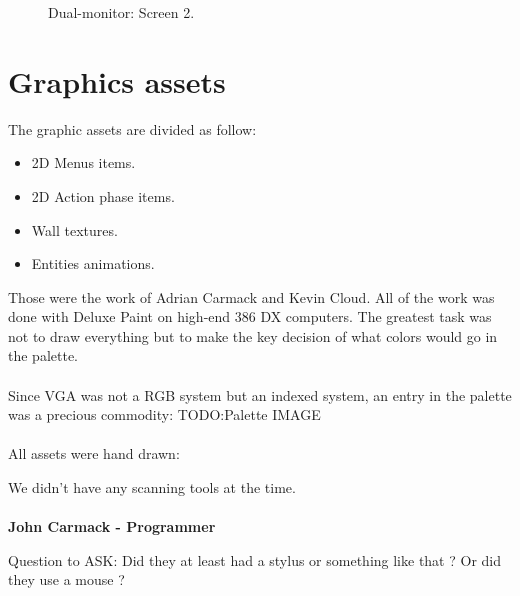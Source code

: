 \documentclass[book.tex]{subfiles}
\begin{document}
\begin{figure}[H]
\centering
\caption{Dual-monitor: Screen 2.}
\label{fig:dm1}
\end{figure}



 
 
 




\section{Graphics assets}
The graphic assets are divided as follow:
\begin{itemize}
\item 2D Menus items.
\item 2D Action phase items.
\item Wall textures.
\item Entities animations.
\end{itemize}
Those were the work of Adrian Carmack and Kevin Cloud. All of the work was done with Deluxe Paint on high-end 386 DX computers. The greatest task was not to draw everything but to make the key decision of what colors would go in the palette.\\
\\
Since VGA was not a RGB system but an indexed system, an entry in the palette was a precious commodity:
TODO:Palette IMAGE\\
\\
All assets were hand drawn:\\
\begin{fancyquotes}
We didn't have any scanning tools at the time.\\
\\
\textbf{John Carmack - Programmer}
\end{fancyquotes}
Question to ASK: Did they at least had a stylus or something like that ?	 Or did they use a mouse ?\\
\end{document}
